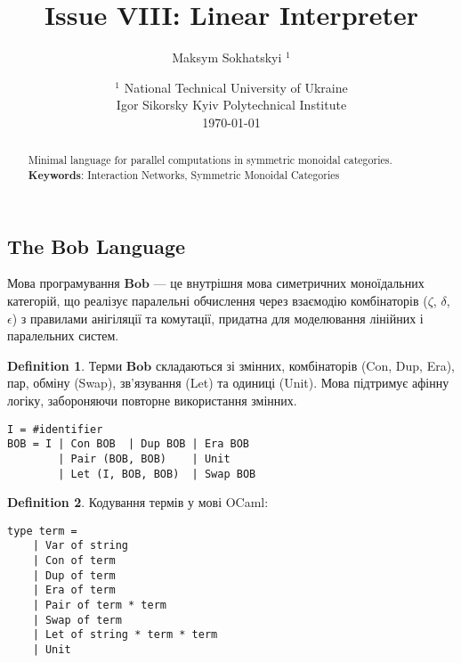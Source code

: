 \documentclass{article}
\theoremstyle{definition}
\newtheorem{definition}{Definition}
\begin{document}
\title{Issue VIII: Linear Interpreter}
\author{Maksym Sokhatskyi $^1$}
\date{ $^1$ National Technical University of Ukraine \\
       \small Igor Sikorsky Kyiv Polytechnical Institute \\
       \today }

\maketitle

\begin{abstract}

Minimal language for parallel computations in symmetric monoidal categories. \\
{\bf Keywords}: Interaction Networks, Symmetric Monoidal Categories
\end{abstract}

\ifincludeTOC
  \tableofcontents
\fi

\newpage

\subsection{The Bob Language}

Мова програмування $\mathbf{Bob}$ — це внутрішня мова симетричних моноїдальних категорій,
що реалізує паралельні обчислення через взаємодію комбінаторів ($\zeta$, $\delta$, $\epsilon$) з правилами
анігіляції та комутації, придатна для моделювання лінійних і паралельних систем.

\begin{definition}
Терми $\mathbf{Bob}$ складаються зі змінних, комбінаторів (Con, Dup, Era), пар, обміну (Swap),
зв’язування (Let) та одиниці (Unit). Мова підтримує афінну логіку, забороняючи повторне використання змінних.
\begin{lstlisting}[mathescape=true]
I = #identifier
BOB = I | Con BOB  | Dup BOB | Era BOB
        | Pair (BOB, BOB)    | Unit
        | Let (I, BOB, BOB)  | Swap BOB
\end{lstlisting}
\end{definition}

\begin{definition}
Кодування термів у мові OCaml:
\begin{lstlisting}[mathescape=true]
type term =
    | Var of string
    | Con of term
    | Dup of term
    | Era of term
    | Pair of term * term
    | Swap of term
    | Let of string * term * term
    | Unit
\end{lstlisting}
\end{definition}
\end{document}
